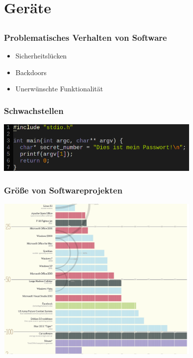 \documentclass[12pt]{beamer}
\begin{document}
\section{Geräte}
\subsection{}

\begin{frame}
  \frametitle{Problematisches Verhalten von Software}
  \begin{itemize}
    \item<2-> Sicherheitslücken
    \item<3-> Backdoors
    \item<4-> Unerwünschte Funktionalität
  \end{itemize}
\end{frame}

\begin{frame}
  \frametitle{Schwachstellen}
  \begin{center}
    \includegraphics[width=10cm]{img/formatstring.png}
  \par\end{center}
\end{frame}

\begin{frame}
  \frametitle{Größe von Softwareprojekten}
  \begin{center}
    \includegraphics[width=10cm]{img/linesofcode.png}
  \par\end{center}
\end{frame}
\end{document}
